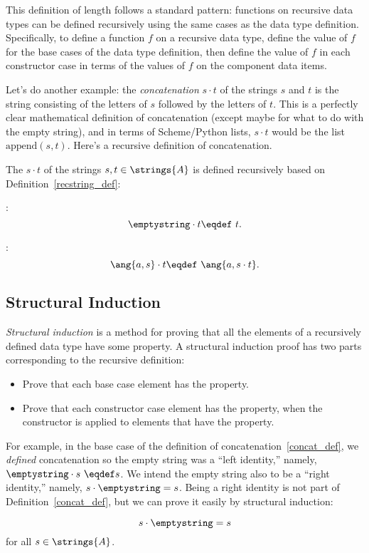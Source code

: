 This definition of length follows a standard pattern: functions on
recursive data types can be defined recursively using the same cases
as the data type definition.  Specifically, to define a function $f$
on a recursive data type, define the value of $f$ for the base cases
of the data type definition, then define the value of $f$ in each
constructor case in terms of the values of $f$ on the component data
items.

Let's do another example: the \emph{concatenation} $s\cdot t$ of the
strings $s$ and $t$ is the string consisting of the letters of $s$
followed by the letters of $t$.  This is a perfectly clear
mathematical definition of concatenation (except maybe for what to do
with the empty string), and in terms of Scheme/Python lists, $s\cdot
t$ would be the list $\text{append}(s, t)$.  Here's a recursive
definition of concatenation.

\begin{definition}\label{concat_def}
The  $s\cdot t$ of the strings $s,t \in
\strings{A}$ is defined recursively based on
Definition~\ref{recstring_def}:

\item {}:     %
\[
\emptystring \cdot t \eqdef\ t.
\]

\item {}: %
\[
\ang{a,s} \cdot t \eqdef\ \ang{a, s \cdot t}.
\]
\end{definition}

\subsection{Structural Induction}

\emph{Structural induction}%
is a method for proving that all the elements
of a recursively defined data type have some property.  A structural
induction proof has two parts corresponding to the recursive definition:
\begin{itemize}
\item Prove that each base case element has the property.
\item Prove that each constructor case element has the property, when
  the constructor is applied to elements that have the property.
\end{itemize}

For example, in the base case of the definition of
concatenation~\ref{concat_def}, we \emph{defined} concatenation so the empty
string was a ``left identity,'' namely, $\emptystring \cdot s\ \eqdef s$.  We
intend the empty string also to be a ``right identity,'' namely, $s \cdot
\emptystring = s$.  Being a right identity is not part of
Definition~\ref{concat_def}, but we can prove it easily by structural induction:
\begin{lemma}\label{rightidempty}
\[
s \cdot \emptystring = s
\]
for all $s \in \strings{A}$.
\end{lemma}

